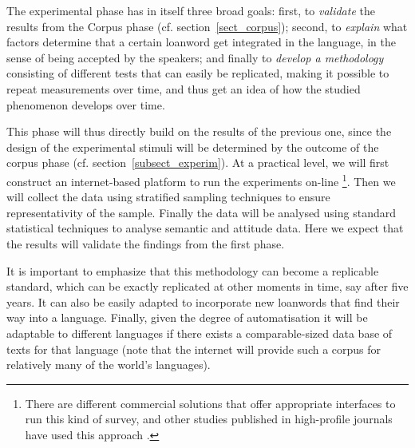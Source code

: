 \documentclass[a4paper]{article}
\begin{document}
The experimental phase has in itself three broad goals:
first, to \emph{validate} the results from the Corpus phase (cf. section~\ref{sect_corpus});
second, to \emph{explain} what factors determine that a certain loanword get integrated in the language, in the sense of being accepted by the speakers;
and finally to \emph{develop a methodology} consisting of different tests that can easily be replicated, making it possible to repeat measurements over time, and thus get an idea of how the studied phenomenon develops over time.

This phase will thus directly build on the results of the previous one, since the design of the experimental stimuli will be determined by the outcome of the corpus phase (cf. section~\ref{subsect_experim}).
At a practical level, we will first construct an internet-based platform to run the experiments on-line%
\footnote{There are different commercial solutions that offer appropriate interfaces to run this kind of survey, and other studies published in high-profile journals have used this approach \citep[e.g.][]{Scontras2012}.}.
Then we will collect the data using stratified sampling techniques to ensure representativity of the sample.
Finally the data will be analysed using standard statistical techniques to analyse semantic and attitude data.
Here we expect that the results will validate the findings from the first phase.

It is important to emphasize that this methodology can become a replicable standard, which can be exactly replicated at other moments in time, say after five years. 
It can also be easily adapted to incorporate new loanwords that find their way into a language.
Finally, given the degree of automatisation it will be adaptable to different languages if there exists a comparable-sized data base of texts for that language (note that the internet will provide such a corpus for relatively many of the world's languages).
\end{document}
